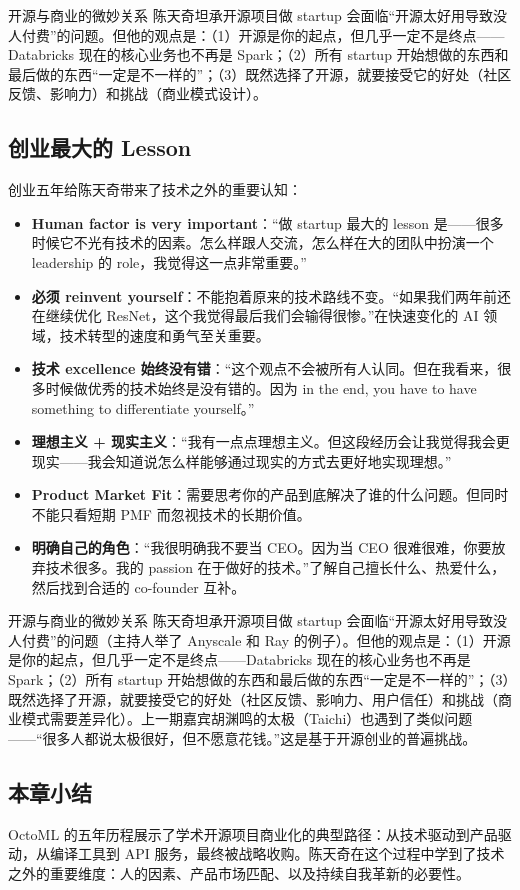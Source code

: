 \begin{warningbox}{开源与商业的微妙关系}
陈天奇坦承开源项目做 startup 会面临``开源太好用导致没人付费''的问题。但他的观点是：（1）开源是你的起点，但几乎一定不是终点------Databricks 现在的核心业务也不再是 Spark；（2）所有 startup 开始想做的东西和最后做的东西``一定是不一样的''；（3）既然选择了开源，就要接受它的好处（社区反馈、影响力）和挑战（商业模式设计）。
\end{warningbox}

\subsection{创业最大的 Lesson}

创业五年给陈天奇带来了技术之外的重要认知：

\begin{itemize}
    \item \textbf{Human factor is very important}：``做 startup 最大的 lesson 是------很多时候它不光有技术的因素。怎么样跟人交流，怎么样在大的团队中扮演一个 leadership 的 role，我觉得这一点非常重要。''
    \item \textbf{必须 reinvent yourself}：不能抱着原来的技术路线不变。``如果我们两年前还在继续优化 ResNet，这个我觉得最后我们会输得很惨。''在快速变化的 AI 领域，技术转型的速度和勇气至关重要。
    \item \textbf{技术 excellence 始终没有错}：``这个观点不会被所有人认同。但在我看来，很多时候做优秀的技术始终是没有错的。因为 in the end, you have to have something to differentiate yourself。''
    \item \textbf{理想主义 + 现实主义}：``我有一点点理想主义。但这段经历会让我觉得我会更现实------我会知道说怎么样能够通过现实的方式去更好地实现理想。''
    \item \textbf{Product Market Fit}：需要思考你的产品到底解决了谁的什么问题。但同时不能只看短期 PMF 而忽视技术的长期价值。
    \item \textbf{明确自己的角色}：``我很明确我不要当 CEO。因为当 CEO 很难很难，你要放弃技术很多。我的 passion 在于做好的技术。''了解自己擅长什么、热爱什么，然后找到合适的 co-founder 互补。
\end{itemize}

\begin{warningbox}{开源与商业的微妙关系}
陈天奇坦承开源项目做 startup 会面临``开源太好用导致没人付费''的问题（主持人举了 Anyscale 和 Ray 的例子）。但他的观点是：（1）开源是你的起点，但几乎一定不是终点------Databricks 现在的核心业务也不再是 Spark；（2）所有 startup 开始想做的东西和最后做的东西``一定是不一样的''；（3）既然选择了开源，就要接受它的好处（社区反馈、影响力、用户信任）和挑战（商业模式需要差异化）。上一期嘉宾胡渊鸣的太极（Taichi）也遇到了类似问题------``很多人都说太极很好，但不愿意花钱。''这是基于开源创业的普遍挑战。
\end{warningbox}

\subsection{本章小结}

OctoML 的五年历程展示了学术开源项目商业化的典型路径：从技术驱动到产品驱动，从编译工具到 API 服务，最终被战略收购。陈天奇在这个过程中学到了技术之外的重要维度：人的因素、产品市场匹配、以及持续自我革新的必要性。

